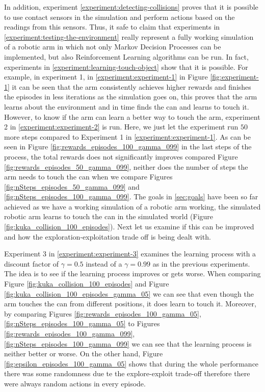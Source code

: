 \documentclass[12pt,oneside]{article}
\begin{document}
In addition, experiment \ref{experiment:detecting-collisions} proves that it is possible to use contact sensors in the simulation and perform actions based on the readings from this sensors. Thus, it safe to claim that experiments in \ref{experiment:testing-the-environment} really represent a fully working simulation of a robotic arm in which not only Markov Decision Processes can be implemented, but also Reinforcement Learning algorithms can be run. In fact, experiments in \ref{experiment:learning-touch-object} show that it is possible. For example, in experiment 1, in \ref{experiment:experiment-1} in Figure \ref{fig:experiment-1} it can be seen that the arm consistently achieves higher rewards and finishes the episodes in less iterations as the simulation goes on, this proves that the arm learns about the environment and in time finds the can and learns to touch it. However, to know if the arm can learn a better way to touch the arm, experiment 2 in \ref{experiment:experiment-2} is run. Here, we just let the experiment run $50$ more steps compared to Experiment 1 in \ref{experiment:experiment-1}. As can be seen in Figure \ref{fig:rewards_episodes_100_gamma_099} in the last steps of the process, the total rewards does not significantly improves compared Figure \ref{fig:rewards_episodes_50_gamma_099}, neither does the number of steps the arm needs to touch the can when we compare Figures \ref{fig:nSteps_episodes_50_gamma_099} and \ref{fig:nSteps_episodes_100_gamma_099}. The goals in \ref{sec:goals} have been so far achieved as we have a working simulation of a robotic arm working, the simulated robotic arm learns to touch the can in the simulated world (Figure \ref{fig:kuka_collision_100_episodes}). Next let us examine if this can be improved and how the exploration-exploitation trade off is being dealt with. 

Experiment 3 in \ref{experiment:experiment-3} examines the learning process with a discount factor of $\gamma = 0.5$ instead of a $\gamma = 0.99$ as in the previous experiments. The idea is to see if the learning process improves or gets worse. When comparing Figure \ref{fig:kuka_collision_100_episodes} and Figure \ref{fig:kuka_collision_100_episodes_gamma_05} we can see that even though the arm touches the can from different positions, it does learn to touch it. Moreover, by comparing Figures \ref{fig:rewards_episodes_100_gamma_05}, \ref{fig:nSteps_episodes_100_gamma_05} to Figures  \ref{fig:rewards_episodes_100_gamma_099}, \ref{fig:nSteps_episodes_100_gamma_099} we can see that the learning process is neither better or worse. On the other hand, Figure \ref{fig:epsilon_episodes_100_gamma_05} shows that during the whole performance there was some randomness due te the explore-exploit trade-off therefore there were always random actions in every episode.
\end{document}
